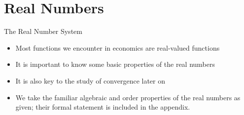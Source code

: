 \documentclass[9pt,aspectratio=169]{beamer}
\begin{document}
\section{Real Numbers}

\begin{frame}{The Real Number System}
    \begin{itemize}
        \item Most functions we encounter in economics are real-valued
        functions
        \item It is important to know some basic properties of the real
        numbers
        \item It is also key to the study of convergence later on
        \item We take the familiar algebraic and order properties of the real
        numbers as given; their formal statement is included in the appendix.
    \end{itemize}
\end{frame}
\end{document}
